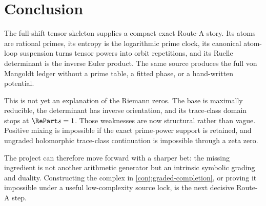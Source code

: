 \section{Conclusion}

The full-shift tensor skeleton supplies a compact exact Route-A story.  Its
atoms are rational primes, its entropy is the logarithmic prime clock, its
canonical atom-loop suspension turns tensor powers into orbit repetitions,
and its Ruelle determinant is the inverse Euler product.  The same source
produces the full von Mangoldt ledger without a prime table, a fitted phase,
or a hand-written potential.

This is not yet an explanation of the Riemann zeros.  The base is maximally
reducible, the determinant has inverse orientation, and its trace-class
domain stops at $\RePart s=1$.  Those weaknesses are now structural rather
than vague.  Positive mixing is impossible if the exact prime-power support
is retained, and ungraded holomorphic trace-class continuation is impossible
through a zeta zero.

The project can therefore move forward with a sharper bet: the missing
ingredient is not another arithmetic generator but an intrinsic symbolic
grading and duality.  Constructing the complex in
\cref{conj:graded-completion}, or proving it impossible under a useful
low-complexity source lock, is the next decisive Route-A step.
